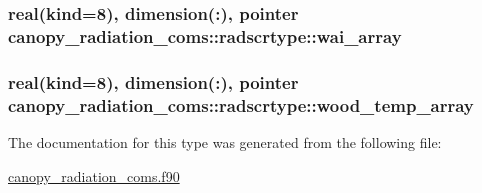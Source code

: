 \subsubsection[{wai\+\_\+array}]{\setlength{\rightskip}{0pt plus 5cm}real(kind=8), dimension(\+:), pointer canopy\+\_\+radiation\+\_\+coms\+::radscrtype\+::wai\+\_\+array}\label{structcanopy__radiation__coms_1_1radscrtype_ac153a4fd9eb5dd14f9b2b77de6ea9a7e}
\hypertarget{structcanopy__radiation__coms_1_1radscrtype_ab2c191fb2e19839b8465587f40b5329a}{}
\subsubsection[{wood\+\_\+temp\+\_\+array}]{\setlength{\rightskip}{0pt plus 5cm}real(kind=8), dimension(\+:), pointer canopy\+\_\+radiation\+\_\+coms\+::radscrtype\+::wood\+\_\+temp\+\_\+array}\label{structcanopy__radiation__coms_1_1radscrtype_ab2c191fb2e19839b8465587f40b5329a}


The documentation for this type was generated from the following file\+:\begin{DoxyCompactItemize}
\item 
\hyperlink{canopy__radiation__coms_8f90}{canopy\+\_\+radiation\+\_\+coms.\+f90}\end{DoxyCompactItemize}
